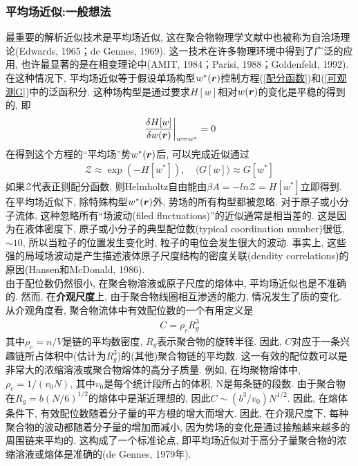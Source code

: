 \subsubsection{平均场近似:一般想法}
最重要的解析近似技术是平均场近似, 这在聚合物物理学文献中也被称为自洽场理论(Edwards, 1965；de Gennes, 1969). 这一技术在许多物理环境中得到了广泛的应用, 也许最显著的是在相变理论中(AMIT, 1984；Parisi, 1988；Goldenfeld, 1992). 在这种情况下, 平均场近似等于假设单场构型$w^*(\bm{r})$控制方程(\ref{配分函数})和(\ref{可观测G})中的泛函积分. 这种场构型是通过要求$H[w]$相对$w(\bm{r})$的变化是平稳的得到的, 即\\
\begin{gather}
	\left. \frac{\delta H[w]}{\delta w(\bm{r})}\right|_{w=w^*} =0 \label{H[w]相对w(r)的变化}
\end{gather}
在得到这个方程的“平均场”势$w^*(\bm{r})$后, 可以完成近似通过\\
\begin{gather}
	\mathcal{Z} \approx \exp(-H[w^*]),\quad \langle G[w]\rangle \approx G[w^*]
\end{gather}
如果$\mathcal{Z}$代表正则配分函数, 则Helmholtz自由能由$\beta A = -ln\mathcal{Z} = H[w^*]$立即得到. \\

在平均场近似下, 除特殊构型$w^*(\bm{r})$外, 势场的所有构型都被忽略. 对于原子或小分子流体, 这种忽略所有“场波动(filed fluctuations)”的近似通常是相当差的. 这是因为在液体密度下, 原子或小分子的典型配位数(typical coordination number)很低, $\sim 10$, 所以当粒子的位置发生变化时, 粒子的电位会发生很大的波动. 事实上, 这些强的局域场波动是产生描述液体原子尺度结构的密度关联(dendity correlations)的原因(Hansen和McDonald, 1986). \\

由于配位数仍然很小, 在聚合物溶液或原子尺度的熔体中, 平均场近似也是不准确的. 然而, 在\textbf{介观尺度}上, 由于聚合物线圈相互渗透的能力, 情况发生了质的变化. 从介观角度看, 聚合物流体中有效配位数的一个有用定义是\\
\begin{gather}
	C=\rho_c R_g^3
\end{gather}
其中$\rho_c=n/V$是链的平均数密度, $R_g$表示聚合物的旋转半径. 因此, $C$对应于一条兴趣链所占体积中(估计为$R_g^3$)的(其他)聚合物链的平均数. 这一有效的配位数可以是非常大的浓缩溶液或聚合物熔体的高分子质量. 例如, 在均聚物熔体中, $\rho_c=1/(v_0N)$, 其中$v_0$是每个统计段所占的体积, N是每条链的段数. 由于聚合物在$R_g=b(N/6)^{1/2}$的熔体中是渐近理想的, 因此$C\sim (b^3/v_0)N^{1/2}$. 因此, 在熔体条件下, 有效配位数随着分子量的平方根的增大而增大. 因此, 在介观尺度下, 每种聚合物的波动都随着分子量的增加而减小, 因为势场的变化是通过接触越来越多的周围链来平均的. 这构成了一个标准论点, 即平均场近似对于高分子量聚合物的浓缩溶液或熔体是准确的(de Gennes, 1979年). \\


